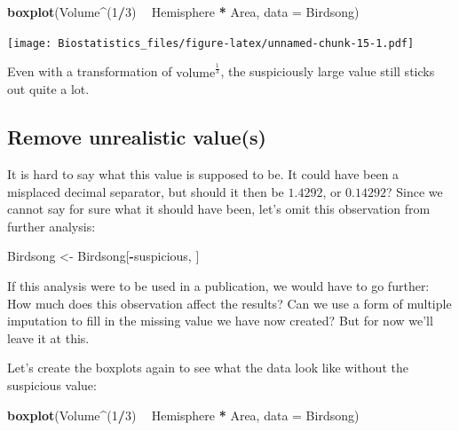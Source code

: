 \documentclass[
]{book}
\newenvironment{Shaded}{\begin{snugshade}}{\end{snugshade}}
\newcommand{\DataTypeTok}[1]{\textcolor[rgb]{0.13,0.29,0.53}{#1}}
\newcommand{\DecValTok}[1]{\textcolor[rgb]{0.00,0.00,0.81}{#1}}
\newcommand{\KeywordTok}[1]{\textcolor[rgb]{0.13,0.29,0.53}{\textbf{#1}}}
\newcommand{\NormalTok}[1]{#1}
\newcommand{\OperatorTok}[1]{\textcolor[rgb]{0.81,0.36,0.00}{\textbf{#1}}}
\newcommand{\StringTok}[1]{\textcolor[rgb]{0.31,0.60,0.02}{#1}}
\begin{document}
\begin{Shaded}
\begin{Highlighting}[]
\KeywordTok{boxplot}\NormalTok{(Volume}\OperatorTok{^}\NormalTok{(}\DecValTok{1}\OperatorTok{/}\DecValTok{3}\NormalTok{) }\OperatorTok{~}\StringTok{ }\NormalTok{Hemisphere }\OperatorTok{*}\StringTok{ }\NormalTok{Area, }\DataTypeTok{data =}\NormalTok{ Birdsong)}
\end{Highlighting}
\end{Shaded}

\texttt{[image: Biostatistics\_files/figure-latex/unnamed-chunk-15-1.pdf]}

Even with a transformation of \(\text{volume}^\frac{1}{3}\), the suspiciously large value still sticks out quite a lot.

\hypertarget{remove-unrealistic-values}{%
\subsection{Remove unrealistic value(s)}\label{remove-unrealistic-values}}

It is hard to say what this value is supposed to be. It could have been a misplaced decimal separator, but should it then be \(1.4292\), or \(0.14292\)? Since we cannot say for sure what it should have been, let's omit this observation from further analysis:

\begin{Shaded}
\begin{Highlighting}[]
\NormalTok{Birdsong <-}\StringTok{ }\NormalTok{Birdsong[}\OperatorTok{-}\NormalTok{suspicious, ]}
\end{Highlighting}
\end{Shaded}

If this analysis were to be used in a publication, we would have to go further: How much does this observation affect the results? Can we use a form of multiple imputation to fill in the missing value we have now created? But for now we'll leave it at this.

Let's create the boxplots again to see what the data look like without the suspicious value:

\begin{Shaded}
\begin{Highlighting}[]
\KeywordTok{boxplot}\NormalTok{(Volume}\OperatorTok{^}\NormalTok{(}\DecValTok{1}\OperatorTok{/}\DecValTok{3}\NormalTok{) }\OperatorTok{~}\StringTok{ }\NormalTok{Hemisphere }\OperatorTok{*}\StringTok{ }\NormalTok{Area, }\DataTypeTok{data =}\NormalTok{ Birdsong)}
\end{Highlighting}
\end{Shaded}
\end{document}
